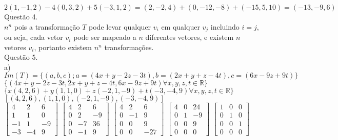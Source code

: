\documentclass[12pt]{article}
\begin{document}
$2(1,-1,2)-4(0,3,2)+5(-3,1,2)=(2,-2,4)+(0,-12,-8)+(-15,5,10)=(-13,-9,6)$\\

\noindent Questão 4.\\

$n^n$ pois a transformação $T$ pode levar qualquer $v_{i}$ em qualquer $v_{j}$ incluindo $i=j$, ou seja, cada vetor $v_{i}$ pode ser mapeado a $n$ diferentes vetores, e existem $n$ vetores $v_{i}$, portanto existem $n^n$ transformações.\\

\noindent Questão 5.\\

\noindent a)\\

$Im(T)=\lbrace(a,b,c);a=(4x+y-2z-3t),b=(2x+y+z-4t),c=(6x-9z+9t)\rbrace$\\

$\lbrace(4x+y-2z-3t,2x+y+z-4t,6x-9z+9t)\forall x,y,z,t \in \mathds{R}\rbrace$\\

$\lbrace x(4,2,6)+y(1,1,0)+z(-2,1,-9)+t(-3,-4,9)\forall x,y,z,t \in \mathds{R}\rbrace$\\

$[(4,2,6),(1,1,0),(-2,1,-9),(-3,-4,9)]$\\

$\begin{bmatrix}
	4 & 2 & 6 \\
	1 & 1 & 0 \\
	-1 & 1 & -9 \\
	-3 & -4 & 9
\end{bmatrix}$\qquad
$\begin{bmatrix}
	4 & 2 & 6 \\
	0 & 2 & -9 \\
	0 & -7 & 36 \\
	0 & -1 & 9
\end{bmatrix}$\qquad
$\begin{bmatrix}
	4 & 2 & 6 \\
	0 & -1 & 9 \\
	0 & 0 & 9 \\
	0 & 0 & -27
\end{bmatrix}$\qquad
$\begin{bmatrix}
	4 & 0 & 24 \\
	0 & 1 & -9 \\
	0 & 0 & 9 \\
	0 & 0 & 0
\end{bmatrix}$\qquad
$\begin{bmatrix}
	1 & 0 & 0 \\
	0 & 1 & 0 \\
	0 & 0 & 1 \\
	0 & 0 & 0
\end{bmatrix}$\\
\end{document}
